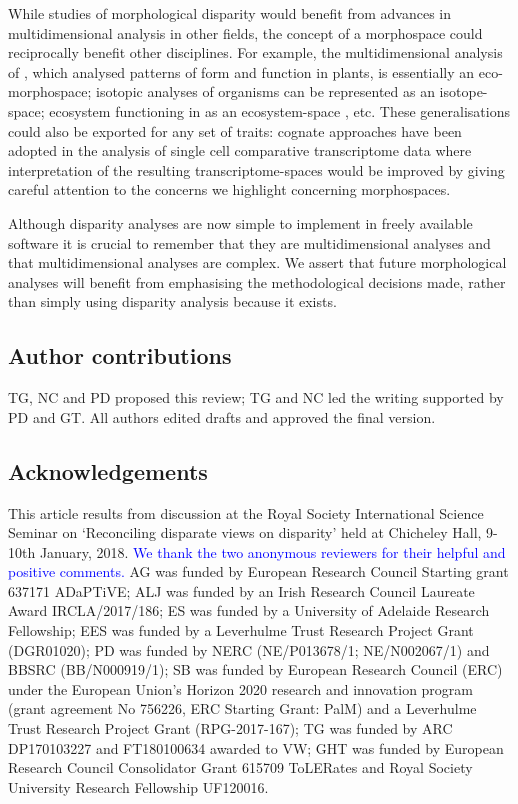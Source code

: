\documentclass[12pt,letterpaper]{article}
\begin{document}
While studies of morphological disparity would benefit from advances in multidimensional analysis in other fields, the concept of a morphospace could reciprocally benefit other disciplines.
For example, the multidimensional analysis of \citep{Diaz2016}, which analysed patterns of form and function in plants, is essentially an eco-morphospace; isotopic analyses of organisms \citep{Jackson2011,Swanson2015} can be represented as an isotope-space; ecosystem functioning in \citealt{Donohue2013} as an ecosystem-space \citep{qiao2017}, etc.
These generalisations could also be exported for any set of traits: cognate approaches have been adopted in the analysis of single cell comparative transcriptome data \citep{Sebe-Pedros2018} where interpretation of the resulting transcriptome-spaces would be improved by giving careful attention to the concerns we highlight concerning morphospaces.

Although disparity analyses are now simple to implement in freely available software \citep{Bouxin2005, oksanen2007vegan, Harmon2008, lloyd2016, Guillerme2018b} it is crucial to remember that they are multidimensional analyses and that multidimensional analyses are complex.
We assert that future morphological analyses will benefit from emphasising the methodological decisions made, rather than simply using disparity analysis because it exists.

\subsection{Author contributions}

TG, NC and PD proposed this review; TG and NC led the writing supported by PD and GT.
All authors edited drafts and approved the final version.

\subsection{Acknowledgements}

This article results from discussion at the Royal Society International Science Seminar on `Reconciling disparate views on disparity' held at Chicheley Hall, 9-10th January, 2018.
\textcolor{blue}{We thank the two anonymous reviewers for their helpful and positive comments.}
AG was funded by European Research Council Starting grant 637171 ADaPTiVE;
ALJ was funded by an Irish Research Council Laureate Award IRCLA/2017/186;
ES was funded by a University of Adelaide Research Fellowship;
EES was funded by a Leverhulme Trust Research Project Grant (DGR01020);
PD was funded by NERC (NE/P013678/1; NE/N002067/1) and BBSRC (BB/N000919/1);
SB was funded by European Research Council (ERC) under the European Union's Horizon 2020 research and innovation program (grant agreement No 756226, ERC Starting Grant: PalM) and a Leverhulme Trust Research Project Grant (RPG-2017-167);
TG was funded by ARC DP170103227 and FT180100634 awarded to VW;
GHT was funded by European Research Council Consolidator Grant 615709 ToLERates and Royal Society University Research Fellowship UF120016.



\end{document}

